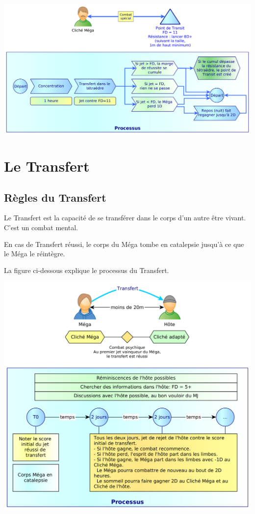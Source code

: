 \documentclass[11pt]{article}
\begin{document}
\begin{center}
\includegraphics[scale=0.28]{05-point-transit}
\end{center}



\newpage
\section{Le Transfert}

\subsection{Règles du Transfert}

Le Transfert est la capacité de se transférer dans le corps d'un autre être vivant. C'est un combat mental.

En cas de Transfert réussi, le corps du Méga tombe en catalepsie jusqu'à ce que le Méga le réintègre.

La figure ci-dessous explique le processus du Transfert.

\begin{center}
\includegraphics[scale=.35]{06-transfert}
\end{center}
\end{document}
